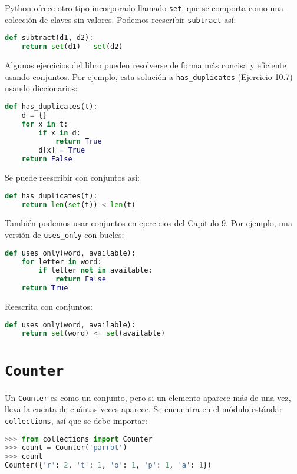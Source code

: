 Python ofrece otro tipo incorporado llamado \texttt{set}, que se comporta como una colección de claves sin valores. Podemos reescribir \texttt{subtract} así:

\begin{lstlisting}[language=Python]
def subtract(d1, d2):
    return set(d1) - set(d2)
\end{lstlisting}

Algunos ejercicios del libro pueden resolverse de forma más concisa y eficiente usando conjuntos. Por ejemplo, esta solución a \texttt{has\_duplicates} (Ejercicio 10.7) usando diccionarios:

\begin{lstlisting}[language=Python]
def has_duplicates(t):
    d = {}
    for x in t:
        if x in d:
            return True
        d[x] = True
    return False
\end{lstlisting}

Se puede reescribir con conjuntos así:

\begin{lstlisting}[language=Python]
def has_duplicates(t):
    return len(set(t)) < len(t)
\end{lstlisting}

También podemos usar conjuntos en ejercicios del Capítulo 9. Por ejemplo, una versión de \texttt{uses\_only} con bucles:

\begin{lstlisting}[language=Python]
def uses_only(word, available):
    for letter in word:
        if letter not in available:
            return False
    return True
\end{lstlisting}

Reescrita con conjuntos:

\begin{lstlisting}[language=Python]
def uses_only(word, available):
    return set(word) <= set(available)
\end{lstlisting}

\section{\texttt{Counter}}

Un \texttt{Counter} es como un conjunto, pero si un elemento aparece más de una vez, lleva la cuenta de cuántas veces aparece. Se encuentra en el módulo estándar \texttt{collections}, así que se debe importar:

\begin{lstlisting}[language=Python]
>>> from collections import Counter
>>> count = Counter('parrot')
>>> count
Counter({'r': 2, 't': 1, 'o': 1, 'p': 1, 'a': 1})
\end{lstlisting}

